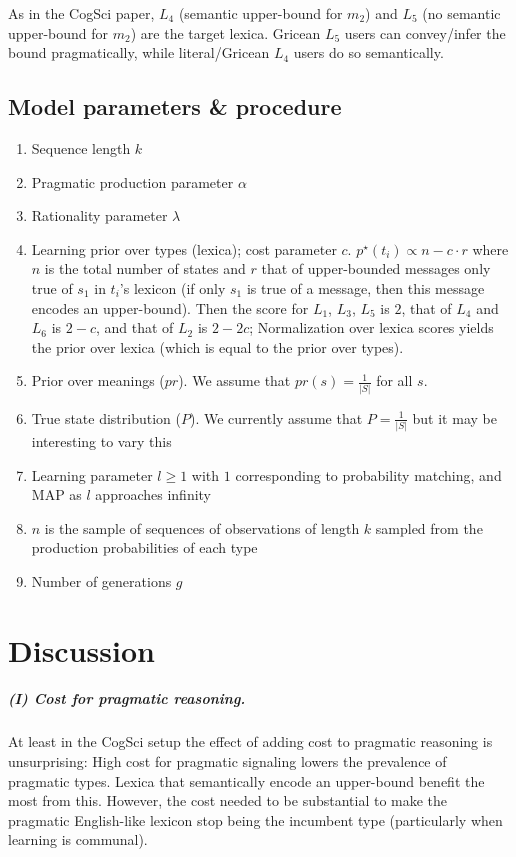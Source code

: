 \documentclass[a4paper]{article}
\begin{document}
As in the CogSci paper, $L_4$ (semantic upper-bound for $m_2$) and $L_5$ (no semantic upper-bound for $m_2$) are the target lexica. Gricean $L_5$ users can convey/infer the bound pragmatically, while literal/Gricean $L_4$ users do so semantically.


\subsection{Model parameters \& procedure} 
\begin{enumerate}
  \item Sequence length $k$
  \item Pragmatic production parameter $\alpha$
  \item Rationality parameter $\lambda$
  \item Learning prior over types (lexica); cost parameter $c$. $p^\star(t_i) \propto n - c \cdot r$ where $n$ is the total number of states and $r$ that of upper-bounded messages only true of $s_1$ in $t_i$'s lexicon (if only $s_1$ is true of a message, then this message encodes an upper-bound). Then the score for $L_1$, $L_3$, $L_5$ is $2$, that of $L_4$ and $L_6$ is $2-c$, and that of $L_2$ is $2-2c$; Normalization over lexica scores yields the prior over lexica (which is equal to the prior over types).   
  \item Prior over meanings ($pr$). We assume that $pr(s) = \frac{1}{|S|}$ for all $s$.
  \item True state distribution ($P$). We currently assume that $P = \frac{1}{|S|}$ but it may be interesting to vary this
  \item Learning parameter $l \geq 1$ with $1$ corresponding to probability matching, and MAP as $l$ approaches infinity
  \item $n$ is the sample of sequences of observations of length $k$ sampled from the production probabilities of each type
  \item Number of generations $g$
\end{enumerate}





\section{Discussion}
\subparagraph{(I) Cost for pragmatic reasoning.} At least in the CogSci setup the effect of adding cost to pragmatic reasoning is unsurprising: High cost for pragmatic signaling lowers the prevalence of pragmatic types. Lexica that semantically encode an upper-bound benefit the most from this. However, the cost needed to be substantial to make the pragmatic English-like lexicon stop being the incumbent type (particularly when learning is communal). 
\end{document}
